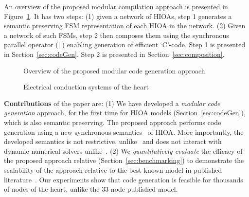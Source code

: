 An overview of the proposed modular compilation approach is presented in
Figure~\ref{fig:overview}. It has two steps: (1) given a network of
\acp{HIOA}, step 1 generates a semantic preserving \ac{FSM}
representation of each \ac{HIOA} in the network. (2) Given a network of
such \acp{FSM}, step 2 then composes them using the synchronous parallel
operator ($||$) enabling generation of efficient `C'-code. Step 1 is
presented in Section~\ref{sec:codeGen}. Step 2 is presented in
Section~\ref{sec:composition}.


\begin{figure}[bthp]
  \centering \scalebox{0.7}{  }
  \caption{Overview of the proposed modular code generation
    approach \label{fig:overview}}
\end{figure}

\begin{figure*}[hbpt]
  \centering 
  \caption{Electrical conduction systems of the heart}
  \label{fig:heartOverview}
\end{figure*}

\textbf{Contributions} of the paper are:  %
  (1) We have
developed a \emph{modular code generation} approach, for the first time
for \ac{HIOA} models (Section~\ref{sec:codeGen}), which is also semantic
preserving. The proposed approach performs code generation using a new
synchronous semantics~\cite{benveniste03} of \ac{HIOA}. More
importantly, the developed semantics is not restrictive,
unlike~\cite{alur2003generating, kim2003modular} and does not interact
with dynamic numerical solvers unlike~\cite{ptolemaeus2014system,
  bourke13zelus}. (2) We \emph{quantitatively evaluate} the efficacy of
the proposed approach relative \simulink
(Section~\ref{sec:benchmarking}) to demonstrate the scalability of the
approach relative to the best known model in published
literature~\cite{chen14}. Our experiments show that code generation is
feasible for thousands of nodes of the heart, unlike the 33-node
published model. %




